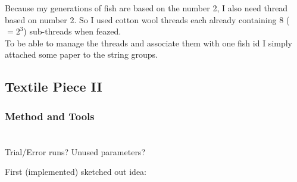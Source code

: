 \documentclass{scrartcl}
\begin{document}
\begin{minipage}[t]{0.48\textwidth}
\end{minipage}
\hspace{0.5cm}
\begin{minipage}[t]{0.48\textwidth}
	Because my generations of fish are based on the number 2, I also need thread based on number 2. So I used cotton wool threads each already containing 8 ($=2^3$) sub-threads when feazed.\\
	To be able to manage the threads and associate them with one fish id I simply attached some paper to the string groups.
\end{minipage}
\vspace{0.5cm}

\subsection{Textile Piece II}
\subsubsection{Method and Tools}

\section{}
\section{}
\subsection{}



Trial/Error runs? Unused parameters?

First (implemented) sketched out idea:
\end{document}
